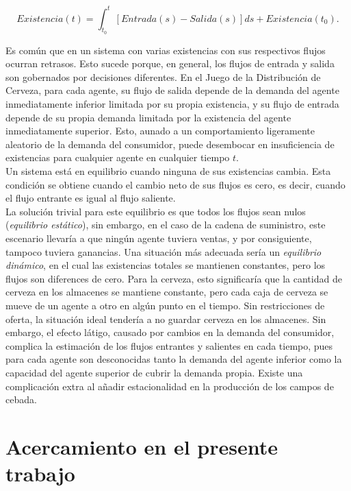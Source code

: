 $$
Existencia(t) = \int_{t_{0}}^t [Entrada(s) - Salida(s)]ds + Existencia(t_{0}). 
$$

Es com\'un que en un sistema con varias existencias con sus respectivos flujos ocurran retrasos. Esto sucede porque, en general, los flujos de entrada y salida son gobernados por decisiones diferentes. En el Juego de la Distribuci\'on de Cerveza, para cada agente, su flujo de salida depende de la demanda del agente inmediatamente inferior limitada por su propia existencia, y su flujo de entrada depende de su propia demanda limitada por la existencia del agente inmediatamente superior. Esto, aunado a un comportamiento ligeramente aleatorio de la demanda del consumidor, puede desembocar en insuficiencia de existencias para cualquier agente en cualquier tiempo $t$. \\

Un sistema est\'a en equilibrio cuando ninguna de sus existencias cambia. Esta condici\'on se obtiene cuando el cambio neto de sus flujos es cero, es decir, cuando el flujo entrante es igual al flujo saliente. \\

La soluci\'on trivial para este equilibrio es que todos los flujos sean nulos (\textit{equilibrio est\'atico}), sin embargo, en el caso de la cadena de suministro, este escenario llevar\'ia a que ning\'un agente tuviera ventas, y por consiguiente, tampoco tuviera ganancias. Una situaci\'on m\'as adecuada ser\'ia un \textit{equilibrio din\'amico}, en el cual las existencias totales se mantienen constantes, pero los flujos son diferences de cero. Para la cerveza, esto significar\'ia que la cantidad de cerveza en los almacenes se mantiene constante, pero cada caja de cerveza se mueve de un agente a otro en alg\'un punto en el tiempo. Sin restricciones de oferta, la situaci\'on ideal tender\'ia a no guardar cerveza en los almacenes. Sin embargo, el efecto l\'atigo, causado por cambios en la demanda del consumidor, complica la estimaci\'on de los flujos entrantes y salientes en cada tiempo, pues para cada agente son desconocidas tanto la demanda del agente inferior como la capacidad del agente superior de cubrir la demanda propia. Existe una complicaci\'on extra al a\~nadir estacionalidad en la producci\'on de los campos de cebada. \\

\section{Acercamiento en el presente trabajo}

